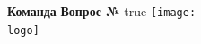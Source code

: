 \def \iflogo {true}
    
    \noindent
    \hspace{-2mm}\textbf{Команда {\LARGE\theteams}} \hfill \textbf{Вопрос №}
    \vfill
    \ifx\iflogo\useLogo
      {\hspace{-3mm}\texttt{[image: \\logo]}}
    \else \ 
    \fi
    \newline \newline \newline
    

